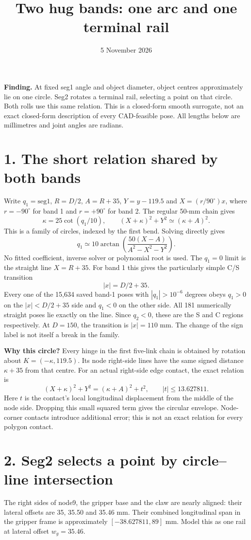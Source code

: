 \documentclass[11pt]{article}
\title{Two hug bands: one arc and one terminal rail}
\date{5 November 2026}
\begin{document}
\maketitle
\noindent\textbf{Finding.} At fixed seg1 angle and object diameter, object centres
approximately lie on one circle. Seg2 rotates a terminal rail, selecting a point
on that circle. Both rolls use this same relation. This is a closed-form smooth
surrogate, not an exact closed-form description of every CAD-feasible pose.
All lengths below are millimetres and joint angles are radians.

\section*{1. The short relation shared by both bands}
Write $q_1=\mathrm{seg1}$, $R=D/2$, $A=R+35$, $Y=y-119.5$ and
$X=(r/90^\circ)x$, where $r=-90^\circ$ for band 1 and $r=+90^\circ$ for band 2.
The regular 50-mm chain gives
\[
 \kappa=25\cot(q_1/10),\qquad
 \boxed{(X+\kappa)^2+Y^2\simeq(\kappa+A)^2.}
\]
This is a family of circles, indexed by the first bend. Solving directly gives
\[
 \boxed{q_1\simeq10\arctan
 \left(\frac{50(X-A)}{A^2-X^2-Y^2}\right).}
\]
No fitted coefficient, inverse solver or polynomial root is used.
The $q_1=0$ limit is the straight line $X=R+35$.
For band 1 this gives the particularly simple C/S transition
\[
 \boxed{|x|=D/2+35.}
\]
Every one of the 15,634 saved band-1 poses with $|q_1|>10^{-6}$ degrees
obeys $q_1>0$ on the $|x|<D/2+35$ side and $q_1<0$ on the other side.
All 181 numerically straight poses lie exactly on the line. Since $q_2<0$,
these are the S and C regions respectively. At $D=150$, the transition is
$|x|=110$ mm. The change of the sign label is not itself a break in the family.

\textbf{Why this circle?} Every hinge in the first five-link chain is obtained
by rotation about $K=(-\kappa,119.5)$. Its node right-side lines have the same
signed distance $\kappa+35$ from that centre. For an actual right-side edge
contact, the exact relation is
\[
 (X+\kappa)^2+Y^2=(\kappa+A)^2+t^2,
 \qquad |t|\le13.627811.
\]
Here $t$ is the contact's local longitudinal displacement from the middle of
the node side. Dropping this small squared term gives the circular envelope.
Node-corner contacts introduce additional error; this is not an exact relation
for every polygon contact.

\section*{2. Seg2 selects a point by circle--line intersection}
The right sides of node9, the gripper base and the claw are nearly aligned:
their lateral offsets are 35, 35.50 and 35.46 mm. Their combined longitudinal
span in the gripper frame is approximately $[-38.627811,89]$ mm.
Model this as one rail at lateral offset $w_g=35.46$.
\end{document}
